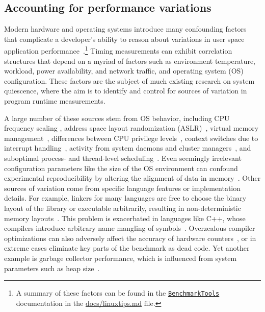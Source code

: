 \documentclass[conference]{IEEEtran}
\begin{document}
\subsection{Accounting for performance variations}
\label{sec:variations}

Modern hardware and operating systems introduce many confounding factors that complicate a
developer's ability to reason about variations in user space application
performance~\cite{HP5e}.\footnote{A summary of these factors can be found in the
\href{https://github.com/JuliaCI/BenchmarkTools.jl}{\lstinline|BenchmarkTools|}
documentation in the
\href{https://github.com/JuliaCI/BenchmarkTools.jl/blob/4db27210d43abf2c55226366f3a749afe1d64951/doc/linuxtips.md}{docs/linuxtips.md}
file.} Timing measurements can exhibit correlation structures that depend on a myriad of
factors such as environment temperature, workload, power availability, and network traffic,
and operating system (OS) configuration. These factors are the subject of much existing
research on system quiescence, where the aim is to identify and control for sources of
variation in program runtime measurements.

A large number of these sources stem from OS behavior, including CPU frequency scaling
\cite{RHEL6}, address space layout randomization (ASLR)~\cite{Shacham2004}, virtual memory
management~\cite{Oyama2014,Oyama2016}, differences between CPU privilege
levels~\cite{Zaparanuks2009}, context switches due to interrupt handling~\cite{Tsafrir2007},
activity from system daemons and cluster managers~\cite{Petrini2003}, and suboptimal
process- and thread-level scheduling~\cite{Lozi2016}. Even seemingly irrelevant
configuration parameters like the size of the OS environment can confound experimental
reproducibility by altering the alignment of data in memory~\cite{Mytkowicz2009}. Other
sources of variation come from specific language features or implementation details. For
example, linkers for many languages are free to choose the binary layout of the library or
executable arbitrarily, resulting in non-deterministic memory layouts~\cite{Georges2008}.
This problem is exacerbated in languages like C++, whose compilers introduce arbitrary name
mangling of symbols~\cite{Kalibera2005}. Overzealous compiler optimizations can also
adversely affect the accuracy of hardware counters~\cite{Zaparanuks2009}, or in extreme
cases eliminate key parts of the benchmark as dead code. Yet another example is garbage
collector performance, which is influenced from system parameters such as heap
size~\cite{Blackburn2004}.
\end{document}
